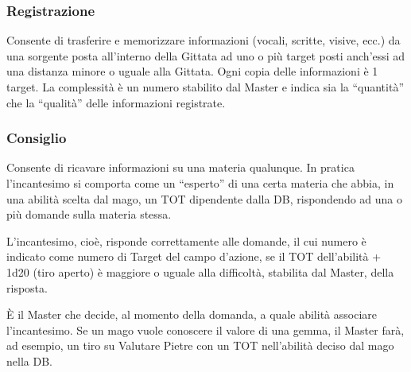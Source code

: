 \iffullversion
\subsubsection{Registrazione} 

Consente di trasferire e memorizzare informazioni (vocali, scritte,
visive, ecc.) da una sorgente posta all'interno della Gittata ad uno
o pi\`u target posti anch'essi ad una distanza minore o uguale alla
Gittata. Ogni copia delle informazioni \`e 1 target. La
complessit\`a \`e un numero stabilito dal Master e indica sia la
``quantit\`a'' che la ``qualit\`a'' delle informazioni registrate.




\fi

\subsubsection{Consiglio} 

Consente di ricavare informazioni su una materia qualunque.  In
pratica l'incantesimo si comporta come un ``esperto'' di una certa
materia che abbia, in una abilit\`a scelta dal mago, un TOT dipendente
dalla DB, rispondendo ad una o pi\`u domande sulla materia stessa.

L'incantesimo, cio\`e, risponde correttamente alle domande, il
cui numero \`e indicato come numero di Target del campo
d'azione, se il TOT dell'abilit\`a + 1d20 (tiro aperto) \`e
maggiore o uguale alla difficolt\`a, stabilita dal Master, della
risposta.

\`E il Master che decide, al momento della domanda, a quale
abilit\`a associare l'incantesimo. 
Se un mago vuole conoscere il valore di una gemma, il Master far\`a,
ad esempio, un tiro su Valutare Pietre con un TOT nell'abilit\`a
deciso dal mago nella DB.




